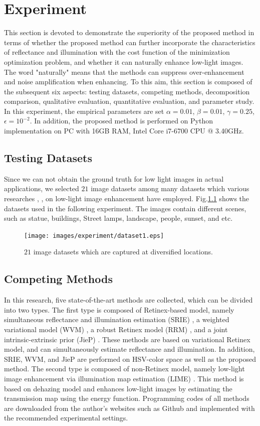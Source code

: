 \chapter{Experiment}
\label{sec:experiment}
This section is devoted to demonstrate the superiority of the proposed method in terms of whether the proposed method can further incorporate the characteristics of reflectance and illumination with the cost function of the minimization optimization problem, and whether it can naturally enhance low-light images. The word "naturally" means that the methods can suppress over-enhancement and noise amplification when enhancing. To this aim, this section is composed of the subsequent six aspects: testing datasets, competing methods, decomposition comparison, qualitative evaluation, quantitative evaluation, and parameter study.
In this experiment, the empirical parameters are set $\alpha=0.01$, $\beta=0.01$, $\gamma=0.25$, $\epsilon=10^{-2}$. In addition, the proposed method is performed on Python implementation on PC with 16GB RAM, Intel Core i7-6700 CPU @ 3.40GHz. 

\section{Testing Datasets} \label{sec:dataset}
Since we can not obtain the ground truth for low light images in actual applications, we selected $21$ image datasets among many datasets which various researches \cite{wvm}, \cite{lime}, \cite{jiep} on low-light image enhancement have employed. Fig.\ref{fig:dataset} shows the datasets used in the following experiment. The images contain different scenes, such as statue, buildings, Street lamps, landscape, people, sunset, and etc.
\begin{figure}[tb]
	\centering
	\texttt{[image: images/experiment/dataset1.eps]}
	\caption{$21$ image datasets which are captured at diversified locations.} \label{fig:dataset}
\end{figure}

\section{Competing Methods} \label{sec:competition}
In this research, five state-of-the-art methods are collected, which can be divided into two types. The first type is composed of Retinex-based model, namely simultaneous reflectance and illumination estimation (SRIE) \cite{srie}, a weighted variational model (WVM) \cite{wvm}, a robust Retinex model (RRM) \cite{rrm}, and a joint intrinsic-extrinsic prior (JieP) \cite{jiep}. These methods are based on variational Retinex model, and can simultaneously estimate reflectance and illumination. In addition, SRIE, WVM, and JieP are performed on HSV-color space as well as the proposed method. The second type is composed of non-Retinex model, namely low-light image enhancement via illumination map estimation (LIME) \cite{lime}. This method is based on dehazing model and enhances low-light images by estimating the transmission map using the energy function. Programming codes of all methods are downloaded from the author's websites such as Github and implemented with the recommended experimental settings.

